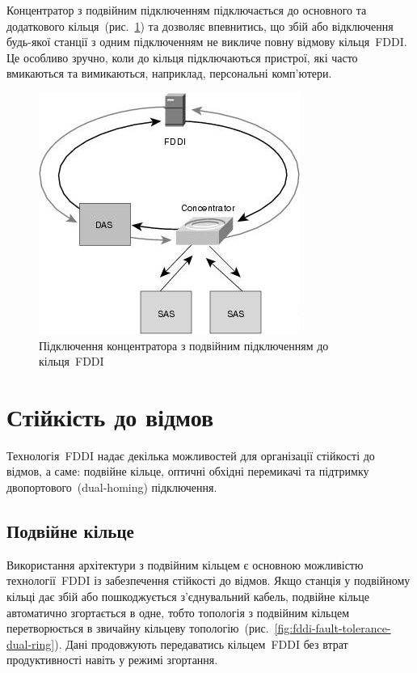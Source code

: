 \documentclass[
	a4paper,
	oneside,
	BCOR = 10mm,
	DIV = 12,
	12pt,
	headings = normal,
]{scrartcl}
\begin{document}
		Концентратор з подвійним підключенням підключається до основного та додаткового кільця~(рис.~\ref{fig:das-attachment}) та дозволяє впевнитись, що збій або відключення будь-якої станції з одним підключенням не викличе повну відмову кільця~\textenglish{FDDI}. Це особливо зручно, коли до кільця підключаються пристрої, які часто вмикаються та вимикаються, наприклад, персональні комп'ютери.

		\begin{figure}[!htbp]
			\centering
			\includegraphics[height = 8\baselineskip]{./assets/y03s01-telecom-homework-01-p05-das-attachment.jpg}
			\caption{Підключення концентратора з подвійним підключенням до кільця~\textenglish{FDDI}}
			\label{fig:das-attachment}
		\end{figure}

	\section{Стійкість до відмов}
		Технологія~\textenglish{FDDI} надає декілька можливостей для організації стійкості до відмов, а саме: подвійне кільце, оптичні обхідні перемикачі та підтримку двопортового~(\textenglish{dual-homing}) підключення.

		\subsection{Подвійне кільце}
			Використання архітектури з подвійним кільцем є основною можливістю технології~\textenglish{FDDI} із забезпечення стійкості до відмов. Якщо станція у подвійному кільці дає збій або пошкоджується з'єднувальний кабель, подвійне кільце автоматично згортається в одне, тобто топологія з подвійним кільцем перетворюється в звичайну кільцеву топологію~(рис.~\ref{fig:fddi-fault-tolerance-dual-ring}). Дані продовжують передаватись кільцем~\textenglish{FDDI} без втрат продуктивності навіть у режимі згортання.
\end{document}
